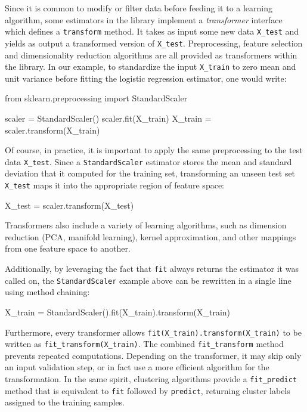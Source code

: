\documentclass{llncs}
\begin{document}
Since it is common to modify or filter data before feeding it to a learning
algorithm, some estimators in the library implement a \textit{transformer}
interface which defines a \texttt{transform} method. It takes as input some new
data \texttt{X\_test} and yields as output a transformed version of
\texttt{X\_test}. Preprocessing, feature selection and dimensionality reduction
algorithms are all provided as transformers within the library.  In our example,
to standardize the input \texttt{X\_train} to zero mean and unit variance
before fitting the logistic regression estimator,
one would write:
\begin{pythoncode}
from sklearn.preprocessing import StandardScaler

scaler = StandardScaler()
scaler.fit(X_train)
X_train = scaler.transform(X_train)
\end{pythoncode}
Of course, in practice, it is important to apply the same preprocessing to the
test data \texttt{X\_test}. Since a \texttt{StandardScaler} estimator stores the
mean and standard deviation that it computed for the training set, transforming
an unseen test set \texttt{X\_test} maps it into the appropriate region of
feature space:
\begin{pythoncode}
X_test = scaler.transform(X_test)
\end{pythoncode}
Transformers also include a variety of learning algorithms, such as
dimension reduction (PCA, manifold learning), kernel approximation,
and other mappings from one feature space to another.

Additionally, by leveraging the fact that \texttt{fit} always returns the
estimator it was called on, the \texttt{StandardScaler} example above can be
rewritten in a single line using method chaining:
\begin{pythoncode}
X_train = StandardScaler().fit(X_train).transform(X_train)
\end{pythoncode}

Furthermore, every transformer allows \texttt{fit(X\_train).transform(X\_train)}
to be written as \texttt{fit\_transform(X\_train)}.
The combined \texttt{fit\_transform} method prevents repeated computations.
Depending on the transformer,
it may skip only an input validation step,
or in fact use a more efficient algorithm for the transformation.
In the same spirit, clustering algorithms provide a
\texttt{fit\_predict} method
that is equivalent to \texttt{fit} followed by \texttt{predict},
returning cluster labels assigned to the training samples.
\end{document}
